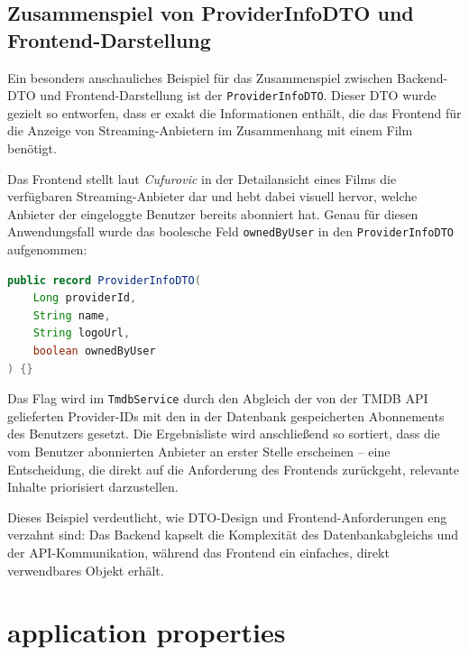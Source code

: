 \subsection{Zusammenspiel von ProviderInfoDTO und Frontend-Darstellung}

Ein besonders anschauliches Beispiel für das Zusammenspiel zwischen
Backend-DTO und Frontend-Darstellung ist der \texttt{ProviderInfoDTO}.
Dieser DTO wurde gezielt so entworfen, dass er exakt die Informationen
enthält, die das Frontend für die Anzeige von Streaming-Anbietern
im Zusammenhang mit einem Film benötigt.

Das Frontend stellt laut \textit{Cufurovic} in der Detailansicht eines
Films die verfügbaren Streaming-Anbieter dar und hebt dabei visuell
hervor, welche Anbieter der eingeloggte Benutzer bereits abonniert hat.
Genau für diesen Anwendungsfall wurde das boolesche Feld
\texttt{ownedByUser} in den \texttt{ProviderInfoDTO} aufgenommen:

\begin{lstlisting}[language=java, caption={ProviderInfoDTO mit ownedByUser-Flag}]
public record ProviderInfoDTO(
    Long providerId,
    String name,
    String logoUrl,
    boolean ownedByUser
) {}
\end{lstlisting}

Das Flag wird im \texttt{TmdbService} durch den Abgleich der von der
TMDB API gelieferten Provider-IDs mit den in der Datenbank gespeicherten
Abonnements des Benutzers gesetzt. Die Ergebnisliste wird anschließend
so sortiert, dass die vom Benutzer abonnierten Anbieter an erster Stelle
erscheinen -- eine Entscheidung, die direkt auf die Anforderung des
Frontends zurückgeht, relevante Inhalte priorisiert darzustellen.

Dieses Beispiel verdeutlicht, wie DTO-Design und Frontend-Anforderungen
eng verzahnt sind: Das Backend kapselt die Komplexität des Datenbankabgleichs
und der API-Kommunikation, während das Frontend ein einfaches,
direkt verwendbares Objekt erhält.

\section{application properties}

